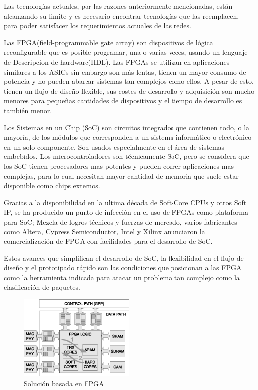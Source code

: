 Las tecnologías actuales, por las razones anteriormente mencionadas, están alcanzando su limite y es necesario encontrar tecnologías que las reemplacen, para poder satisfacer los requerimientos actuales de las redes. 

Las FPGA(field-programmable gate array) son dispositivos de lógica reconfigurable que es posible programar, una o varias veces, usando un lenguaje de Descripcion de hardware(HDL). Las FPGAs se utilizan en aplicaciones similares a los ASICs sin embargo son más lentas, tienen un mayor consumo de potencia y no pueden abarcar sistemas tan complejos como ellos. A pesar de esto, tienen un flujo de diseño flexible, sus costes de desarrollo y adquisición son mucho menores para pequeñas cantidades de dispositivos y el tiempo de desarrollo es también menor.


Los Sistemas en un Chip (SoC) son circuitos integrados que contienen todo, o la mayoría, de los módulos que corresponden a un sistema informático o electrónico en un solo componente. Son usados especialmente en el área de sistemas embebidos. Los microcontroladores son técnicamente SoC, pero se considera que los SoC tienen procesadores mas potentes y pueden correr aplicaciones mas complejas, para lo cual necesitan mayor cantidad de memoria que suele estar disponible como chips externos. 

Gracias a la disponibilidad en la ultima década de Soft-Core CPUs y otros Soft IP, se ha producido un punto de infección en el uso de FPGAs como plataforma para SoC; Mezcla de logros técnicos y fuerzas de mercado, varios fabricantes como Altera, Cypress Semiconductor, Intel y Xilinx anunciaron la comercialización de FPGA con facilidades para el desarrollo de SoC.

Estos avances que simplifican el desarrollo de SoC, la flexibilidad en el flujo de diseño y el prototipado rápido son las condiciones que posicionan a las FPGA como la herramienta indicada para atacar un problema tan complejo como la clasificación de paquetes. 

 \begin{figure}[h]
  \centering
	 \includegraphics[width=0.5\textwidth]{1-introduccion/graf/FPGA_based.eps}
  \caption{Solución basada en FPGA}
  \label{fig:diseno}
\end{figure}

